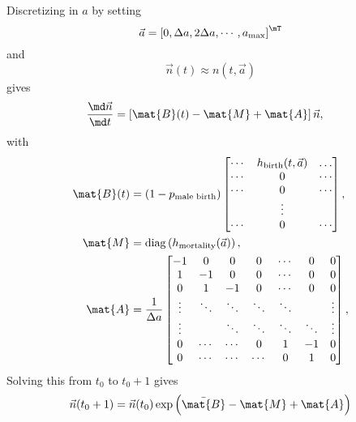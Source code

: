 \documentclass{jpmarticle}
\begin{document}
Discretizing in $a$ by setting
\begin{equation}
  \label{eq:11}
  \vec{a} = \left[0, \Delta a, 2 \Delta a, \cdots, a_{\text{max}} \right]^{\mT}
\end{equation}
and
\begin{equation}
  \vec{n}(t) \approx n(t, \vec{a})
\end{equation}
gives
\begin{equation}
  \begin{split}
    \frac{\md \vec{n}}{\md t} &=
    \left[\mat{B}(t)
      - \mat{M}
      + \mat{A}\right] \vec{n},
  \end{split}
\end{equation}
with
\begin{equation}
  \begin{split}
    \mat{B}(t)
    &=
    (1 - p_{\text{male birth}})
    \begin{bmatrix}
      \cdots & h_{\text{birth}}(t, \vec{a}) & \dots
      \\
      \cdots & 0 & \cdots
      \\
      \cdots & 0 & \cdots
      \\
      & \vdots &
      \\
      \cdots & 0 & \cdots
    \end{bmatrix},
    \\
    \mat{M} &=
    \operatorname{diag}\left(h_{\text{mortality}}(\vec{a})\right),
    \\
    \mat{A} &=
    \frac{1}{\Delta a}
    \begin{bmatrix}
      -1 & 0 & 0 & 0 & \cdots & 0 & 0
      \\
      1 & -1 & 0 & 0 & \cdots & 0 & 0
      \\
      0 & 1 & -1 & 0 & \cdots & 0 & 0
      \\
      \vdots & \ddots & \ddots & \ddots & \ddots &  & \vdots
      \\
      \vdots &  & \ddots & \ddots & \ddots & \ddots & \vdots
      \\
      0  & \cdots & \cdots & 0 & 1 & - 1 & 0
      \\
      0  & \cdots & \cdots & \cdots & 0 & 1 & 0
    \end{bmatrix},
  \end{split}
\end{equation}
Solving this from $t_0$ to $t_0 + 1$ gives
\begin{equation}
  \vec{n}(t_0 + 1) = \vec{n}(t_0)
  \exp\left(\bar{\mat{B}} - \mat{M} + \mat{A}\right)
\end{equation}
\end{document}

